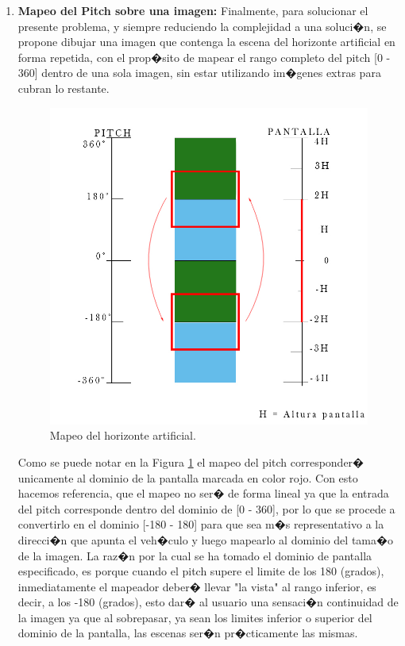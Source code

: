 \begin{enumerate}
\begin{enumerate}
\begin{enumerate}
			\item \textbf{Mapeo del Pitch sobre una imagen: } Finalmente, para solucionar el presente problema, y siempre reduciendo la complejidad a una soluci�n, se propone dibujar una imagen que contenga la escena del horizonte artificial en forma repetida, con el prop�sito de mapear el rango completo del pitch [0 - 360] dentro de una sola imagen, sin estar utilizando im�genes extras para cubran lo restante. 
			
			\begin{figure}[h!]
				\centering
				\includegraphics[width=0.7\linewidth, height=0.5\textheight]{Imagenes/mapeo}
				\caption{Mapeo del horizonte artificial.}
				\label{fig:mapeo}
			\end{figure}
			
			\par Como se puede notar en la Figura \ref{fig:mapeo} el mapeo del pitch corresponder� unicamente al dominio de la pantalla marcada en color rojo. Con esto hacemos referencia, que el mapeo no ser� de forma lineal ya que la entrada del pitch corresponde dentro del dominio de [0 - 360], por lo que se procede a convertirlo en el dominio [-180 - 180] para que sea m�s representativo a la direcci�n que apunta el veh�culo y luego mapearlo al dominio del tama�o de la imagen. La raz�n por la cual se ha tomado el dominio de pantalla especificado, es porque cuando el pitch supere el limite de los 180 (grados), inmediatamente el mapeador deber� llevar "la vista" al rango inferior, es decir, a los -180 (grados), esto dar� al usuario una sensaci�n continuidad de la imagen ya que al sobrepasar, ya sean los limites inferior o superior del dominio de la pantalla, las escenas ser�n pr�cticamente las mismas. 
			

\end{enumerate}
\end{enumerate}
\end{enumerate}
